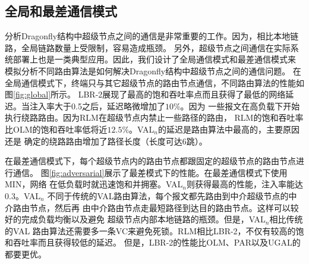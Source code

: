 \subsection{全局和最差通信模式}


分析Dragonfly结构中超级节点之间的通信是非常重要的工作。因为，相比本地链路，全局链路数量上受限制，容易造成瓶颈。
另外，超级节点之间通信在实际系统部署上也是一类典型应用。因此，我们设计了全局通信模式和最差通信模式来
模拟分析不同路由算法是如何解决Dragonfly结构中超级节点之间的通信问题。
在全局通信模式下，终端只与其它超级节点的路由节点通信，不同路由算法的性能如图\ref{fig:global}所示。
LBR-2展现了最高的饱和吞吐率点而且获得了最低的网络延迟。当注入率大于0.5之后，延迟略微增加了$10\%$。因为
一些报文在高负载下开始执行绕路路由。因为RLM在超级节点内禁止一些路径的路由，
RLM的饱和吞吐率比OLM的饱和吞吐率低将近$12.5\%$。VAL$_n$的延迟是路由算法中最高的，主要原因还是
确定的绕路路由增加了路径长度（长度可达6跳）。


\begin{figure*}[htbp]
  \centering
  \begin{minipage}[t]{\textwidth}
  \centering
  \caption{全局通信模式}
  \label{fig:global}
  \end{minipage}
\end{figure*}

在最差通信模式下，每个超级节点内的路由节点都跟固定的超级节点的路由节点进行通信。
图\ref{fig:adversarial}展示了最差模式下的性能。在最差通信模式下使用MIN，网络
在低负载时就迅速饱和并拥塞。VAL$_n$则获得最高的性能，注入率能达0.3。VAL$_n$
不同于传统的VAL路由算法，每个报文都先路由到中介超级节点的中介路由节点，然后再
由中介路由节点走最短路径到达目的路由节点。这样可以较好的完成负载均衡以及避免
超级节点内部本地链路的瓶颈。但是，VAL$_n$相比传统的VAL
路由算法还需要多一条VC来避免死锁。RLM相比LBR-2，不仅有较高的饱和吞吐率而且获得较低的延迟。
但是，LBR-2的性能比OLM、PAR以及UGAL的都要更优。


\begin{figure*}[htbp]
  \centering
   \begin{minipage}[t]{\textwidth}
  \centering
  \caption{最差通信模式}
  \label{fig:adversarial}
  \end{minipage}
  \end{figure*}


